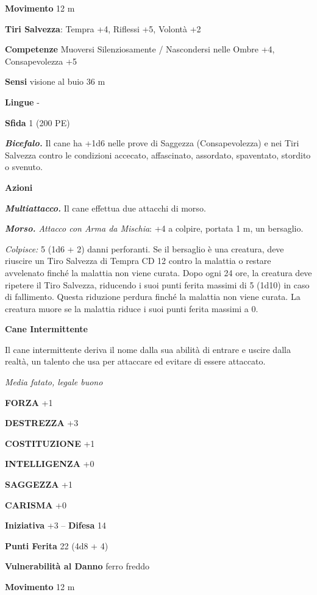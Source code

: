 \begin{multicols}{2}
\textbf{Movimento} 12 m

\textbf{Tiri Salvezza}: Tempra +4, Riflessi +5, Volontà +2

\textbf{Competenze} Muoversi Silenziosamente / Nascondersi nelle Ombre +4, Consapevolezza +5

\textbf{Sensi} visione al buio 36 m

\textbf{Lingue} -

\textbf{Sfida} 1 (200 PE)

\emph{\textbf{Bicefalo.}} Il cane ha +1d6 nelle prove di Saggezza (Consapevolezza) e nei Tiri Salvezza contro le condizioni accecato, affascinato, assordato, spaventato, stordito o svenuto.

\textbf{Azioni}

\emph{\textbf{Multiattacco.}} Il cane effettua due attacchi di morso. 

\emph{\textbf{Morso.} Attacco con Arma da Mischia}: +4 a colpire, portata 1 m, un bersaglio.

\emph{Colpisce:} 5 (1d6 + 2) danni perforanti. Se il bersaglio è una creatura, deve riuscire un Tiro Salvezza di Tempra CD 12 contro la malattia o restare avvelenato finché la malattia non viene curata. Dopo ogni 24 ore, la creatura deve ripetere il Tiro Salvezza, riducendo i suoi punti ferita massimi di 5 (1d10) in caso di fallimento. Questa riduzione perdura finché la malattia non viene curata. La creatura muore se la malattia riduce i suoi punti ferita massimi a 0.

\medskip\textbf{Cane Intermittente}

Il cane intermittente deriva il nome dalla sua abilità di entrare e uscire dalla realtà, un talento che usa per attaccare ed evitare di essere attaccato.

\emph{Media fatato, legale buono}

\textbf{FORZA} +1

\textbf{DESTREZZA} +3

\textbf{COSTITUZIONE} +1

\textbf{INTELLIGENZA} +0

\textbf{SAGGEZZA} +1

\textbf{CARISMA} +0

\textbf{Iniziativa} +3 -- \textbf{Difesa} 14

\textbf{Punti Ferita} 22 (4d8 + 4)

\textbf{Vulnerabilità al Danno} ferro freddo

\textbf{Movimento} 12 m


\end{multicols}

